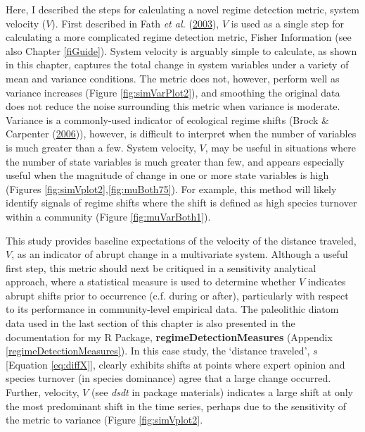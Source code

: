 \documentclass[12pt,twoside,openany]{reedthesis}
\begin{document}
Here, I described the steps for calculating a novel regime detection metric, system velocity (\(V\)). First described in Fath \emph{et al.} (\protect\hyperlink{ref-fath_regime_2003}{2003}), \(V\) is used as a single step for calculating a more complicated regime detection metric, Fisher Information (see also Chapter \ref{fiGuide}). System velocity is arguably simple to calculate, as shown in this chapter, captures the total change in system variables under a variety of mean and variance conditions. The metric does not, however, perform well as variance increases (Figure \ref{fig:simVarPlot2}), and smoothing the original data does not reduce the noise surrounding this metric when variance is moderate. Variance is a commonly-used indicator of ecological regime shifts (Brock \& Carpenter (\protect\hyperlink{ref-brock_variance_2006}{2006})), however, is difficult to interpret when the number of variables is much greater than a few. System velocity, \(V\), may be useful in situations where the number of state variables is much greater than few, and appears especially useful when the magnitude of change in one or more state variables is high (Figures \ref{fig:simVplot2},\ref{fig:muBoth75}). For example, this method will likely identify signals of regime shifts where the shift is defined as high species turnover within a community (Figure \ref{fig:muVarBoth1}).

This study provides baseline expectations of the velocity of the distance traveled, \(V\), as an indicator of abrupt change in a multivariate system. Although a useful first step, this metric should next be critiqued in a sensitivity analytical approach, where a statistical measure is used to determine whether \(V\) indicates abrupt shifts prior to occurrence (c.f. during or after), particularly with respect to its performance in community-level empirical data. The paleolithic diatom data used in the last section of this chapter is also presented in the documentation for my R Package, \textbf{regimeDetectionMeasures} (Appendix \ref{regimeDetectionMeasures}). In this case study, the `distance traveled', \(s\) {[}Equation \eqref{eq:diffX}{]}, clearly exhibits shifts at points where expert opinion and species turnover (in species dominance) agree that a large change occurred. Further, velocity, \(V\) (see \emph{dsdt} in package materials) indicates a large shift at only the most predominant shift in the time series, perhaps due to the sensitivity of the metric to variance (Figure \ref{fig:simVplot2}.
\end{document}
